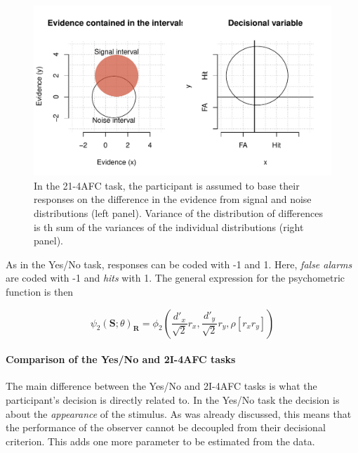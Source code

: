 \documentclass{article}\usepackage{knitr}
\begin{document}
\begin{figure}
\centering
\begin{knitrout}
\color{fgcolor}
\includegraphics[width=\maxwidth]{figure/unnamed-chunk-10-1} 
\end{knitrout}
\caption{In the 21-4AFC task, the participant is assumed to base their responses on the difference in the evidence from signal and noise distributions (left panel). Variance of the distribution of differences is th sum of the variances of the individual distributions (right panel).}
\label{fig:2I4AFC}
\end{figure}

As in the Yes/No task, responses can be coded with -1 and 1. Here, \textit{false alarms} are coded with -1 and \textit{hits} with 1.  The general expression for the psychometric function is then

\begin{equation}
\psi_2(\bm{S}; \theta)_{\bm{R}} = \phi_2(\frac{d'_x}{\sqrt{2}}r_x, \frac{d'_y}{\sqrt{2}} r_y, \rho [r_x r_y])
\label{eq:generalPfun2}
\end{equation}

\paragraph{Comparison of the Yes/No and 2I-4AFC tasks}

The main difference between the Yes/No and 2I-4AFC tasks is what the participant's decision is directly related to. In the Yes/No task the decision is about the \textit{appearance} of the stimulus. As was already discussed, this means that the performance of the observer cannot be decoupled from their decisional criterion. This adds one more parameter to be estimated from the data. 
\end{document}
